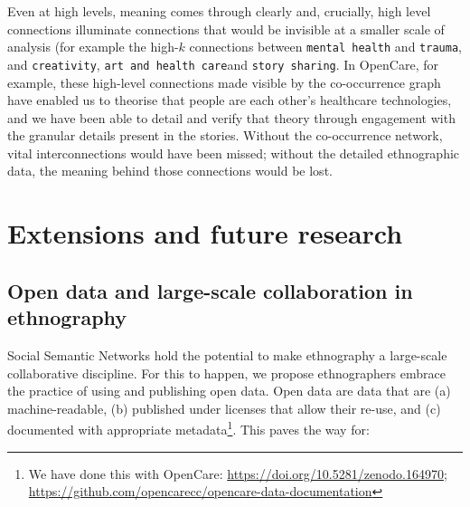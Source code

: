 \documentclass{llncs}
\begin{document}
Even at high levels, meaning comes through clearly and, crucially, high level connections illuminate connections that would be invisible at a smaller scale of analysis (for example the high-$k$ connections between \texttt{mental health} and \texttt{trauma}, and \texttt{creativity}, \texttt{art and health care}and \texttt{story sharing}. In OpenCare, for example, these high-level connections made visible by the co-occurrence graph have enabled us to theorise that people are each other's healthcare technologies, and we have been able to detail and verify that theory through engagement with the granular details present in the stories. Without the co-occurrence network, vital interconnections would have been missed; without the detailed ethnographic data, the meaning behind those connections would be lost. 


\section{Extensions and future research} \label{sec:extensions}

\subsection{Open data and large-scale collaboration in ethnography}

Social Semantic Networks hold the potential to make ethnography a large-scale collaborative discipline. For this to happen, we propose ethnographers embrace the practice of using and publishing open data. Open data are data that are (a) machine-readable, (b) published under licenses that allow their re-use, and (c) documented with appropriate metadata\footnote{We have done this with OpenCare: \url{https://doi.org/10.5281/zenodo.164970}; \url{https://github.com/opencarecc/opencare-data-documentation}}. This paves the way for:
\end{document}

